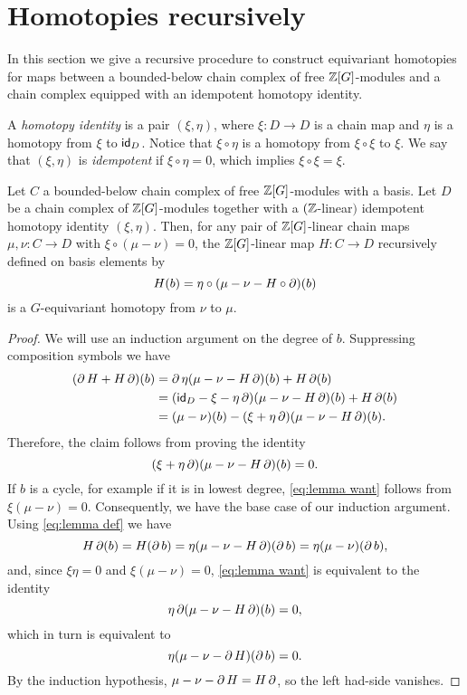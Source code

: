 
\section{Homotopies recursively}\label{s:equivariant homotopy general}

In this section we give a recursive procedure to construct equivariant homotopies for maps between a bounded-below chain complex of free $\mathbb{Z}[G]$-modules and a chain complex equipped with an idempotent homotopy identity.

\begin{definition}
	A \textit{homotopy identity} is a pair $(\xi,\eta)$, where $\xi \colon D \to D$ is a chain map and $\eta$ is a homotopy from $\xi$ to $\mathsf{id}_D$.
	Notice that $\xi \circ \eta$ is a homotopy from $\xi \circ \xi$ to $\xi$.
	We say that $(\xi, \eta)$ is \textit{idempotent} if $\xi \circ \eta = 0$, which implies $\xi \circ \xi = \xi$.
\end{definition}

\begin{theorem}\label{t:recursive_homotopy}
	Let $C$ a bounded-below chain complex of free $\mathbb{Z}[G]$-modules with a basis.
	Let $D$ be a chain complex of $\mathbb{Z}[G]$-modules together with a $(\mathbb{Z}$-linear$)$ idempotent homotopy identity $(\xi, \eta)$.
	Then, for any pair of $\mathbb{Z}[G]$-linear chain maps $\mu,\nu \colon C \to D$ with $\xi \circ (\mu -\nu) = 0$, the $\mathbb{Z}[G]$-linear map $H \colon C \to D$ recursively defined on basis elements by
	\begin{equation}\label{eq:lemma def}
		H(b) = \eta \circ (\mu - \nu - H \circ \operatorname{\partial})(b)
	\end{equation}
	is a $G$-equivariant homotopy from $\nu$ to $\mu$.
\end{theorem}

\begin{proof}
	We will use an induction argument on the degree of $b$.
	Suppressing composition symbols we have
	\begin{align*}
		(\operatorname{\partial} H + H \operatorname{\partial})(b)
		&= \operatorname{\partial} \eta(\mu - \nu - H \operatorname{\partial})(b) + H \operatorname{\partial} (b) \\
		&= (\mathsf{id}_D - \xi - \eta \operatorname{\partial})(\mu - \nu - H \operatorname{\partial})(b) + H \operatorname{\partial}(b) \\
		&= (\mu-\nu)(b) - (\xi + \eta \operatorname{\partial})(\mu - \nu - H \operatorname{\partial})(b).
	\end{align*}
	Therefore, the claim follows from proving the identity
	\begin{equation}\label{eq:lemma want}
		(\xi + \eta \operatorname{\partial})(\mu - \nu - H \operatorname{\partial})(b) = 0.
	\end{equation}
	If $b$ is a cycle, for example if it is in lowest degree, \eqref{eq:lemma want} follows from $\xi(\mu-\nu) = 0$.
	Consequently, we have the base case of our induction argument.
	Using \eqref{eq:lemma def} we have
	\[
	H\operatorname{\partial} (b) = H(\operatorname{\partial} b) = \eta(\mu-\nu-H\operatorname{\partial})(\operatorname{\partial} b) = \eta(\mu-\nu)(\operatorname{\partial} b),
	\]
	and, since $\xi \eta = 0$ and $\xi(\mu-\nu)=0$, \eqref{eq:lemma want} is equivalent to the identity
	\[
	\eta \operatorname{\partial} (\mu-\nu - H\operatorname{\partial})(b) = 0,
	\]
	which in turn is equivalent to
	\[
	\eta (\mu-\nu - \operatorname{\partial} H)(\operatorname{\partial} b) = 0.
	\]
	By the induction hypothesis, $\mu-\nu-\operatorname{\partial} H = H\operatorname{\partial}$, so the left had-side vanishes.
\end{proof}


